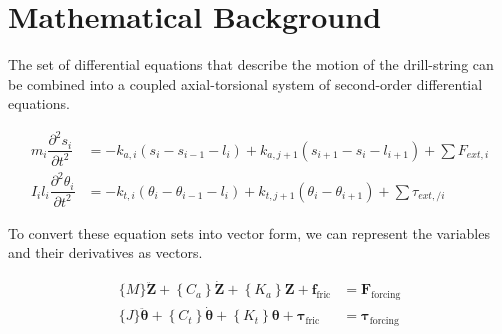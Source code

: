 \section{Mathematical Background}

The set of differential equations that describe the motion of the drill-string can be combined into a coupled axial-torsional system of second-order differential equations.

\begin{align}\label{Governing equations}
     m_{i}\dfrac{\partial^{2}s_{i}}{\partial t^{2}} & = -k_{a,i}(s_{i}-s_{i-1}-l_{i}) + k_{a,j+1}(s_{i+1}-s_{i}-l_{i+1}) + \sum{F_{ext, i}} \\
     I_{i}l_{i}\dfrac{\partial^{2}\theta_{i}}{\partial t^{2}} & = -k_{t,i}(\theta_{i}-\theta_{i-1}-l_{i}) + k_{t,j+1}(\theta_{i}-\theta_{i+1}) + \sum{\tau_{ext,/ i}}
\end{align}

To convert these equation sets into vector form, we can represent the variables and their derivatives as vectors.

\begin{align}
  \{M\} \ddot{\boldsymbol{Z}}+\left\{C_a\right\} \dot{\boldsymbol{Z}}+\left\{K_a\right\} \boldsymbol{Z}+\boldsymbol{f}_{\text{fric}} &= \boldsymbol{F}_{\text{forcing}} \label{eq:em_axial_vector_form}\\
  \{J\} \ddot{\boldsymbol{\theta}}+\left\{C_t\right\} \dot{\boldsymbol{\theta}}+\left\{K_t\right\} \boldsymbol{\theta}+\boldsymbol{\tau}_{\text{fric}} &= \boldsymbol{\tau}_{\text{forcing}} \label{eq:em_torsional_vector_form}
\end{align}


